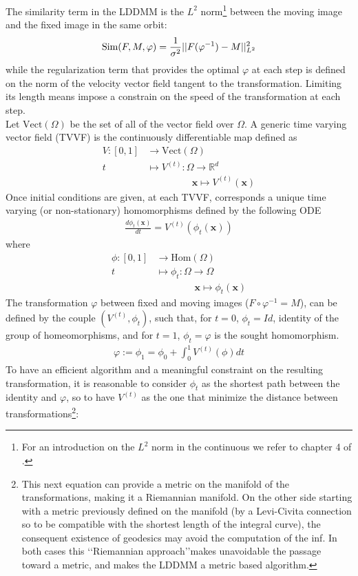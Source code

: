The similarity term in the LDDMM is the $L^{2}$ norm\footnote{For an introduction on the $L^2$ norm in the continuous we refer to chapter 4 of \cite{stein2009real}.} between the moving image and the fixed image in the same orbit:
\begin{align*}
\text{Sim}(F,M,\varphi) = \frac{1}{\sigma^2}\vert\lvert F(\varphi^{-1})  - M   \rvert\vert_{L^{2}}^{2}
\end{align*}
while the regularization term that provides the optimal $\varphi$ at each step is defined on the norm of the velocity vector field tangent to the transformation. Limiting its length means impose a constrain on the speed of the transformation at each step. \\
Let $\text{Vect}(\Omega)$ be the set of all of the vector field over $\Omega$. A generic time varying vector field (TVVF) is the continuously differentiable map defined as
\begin{align*}
V:[0,1] & \longrightarrow  \text{Vect}(\Omega)\\
t  &\longmapsto  V^{(t)}  : \Omega \longrightarrow   \mathbb{R}^{d} \\
& \qquad \quad \quad ~~~\mathbf{x} \longmapsto V^{(t)}(\mathbf{x} )
\end{align*}
 Once initial conditions are given, at each TVVF, corresponds a unique time varying (or non-stationary) homomorphisms defined  by the following ODE 
\begin{align}\label{eq:ode_phi_v}
\frac{d\phi_{t} (\mathbf{x})}{dt} = V^{(t)}(\phi_{t}(\mathbf{x} ))
\end{align}
where 
\begin{align*}
\phi : [0,1] & \longrightarrow  \text{Hom}(\Omega)\\
t  &\longmapsto \phi_{t}  : \Omega \longrightarrow    \Omega \\
& \qquad \quad \quad  \mathbf{x} \longmapsto \phi_{t}  (\mathbf{x} )
\end{align*}
The transformation $\varphi$ between fixed and moving images ($ F\circ \varphi^{-1} = M $), can be defined by the couple $(V^{(t)},\phi_{t})$, such that, for $t = 0$, $\phi_{t} = Id$, identity of the group of homeomorphisms, and for $t = 1$, $\phi_{t} = \varphi$ is the sought homomorphism.
\begin{align*}
\varphi := \phi_{1} = \phi_{0} + \int_0^1 V^{(t)} (\phi) dt
\end{align*}
To have an efficient algorithm and a meaningful constraint on the resulting transformation, it is reasonable to consider $\phi_{t}$ as the shortest path between the identity and $\varphi$, so to have $V^{(t)} $ as the one that minimize the distance between transformations\footnote{This next equation can provide a metric on the manifold of the transformations, making it a Riemannian manifold. On the other side starting with a metric previously defined on the manifold (by a Levi-Civita connection so to be compatible with the shortest length of the integral curve), the consequent existence of geodesics may avoid the computation of the inf. In both cases this \lq\lq Riemannian approach\rq\rq  makes unavoidable the passage toward a metric, and makes the LDDMM a metric based algorithm.}:

